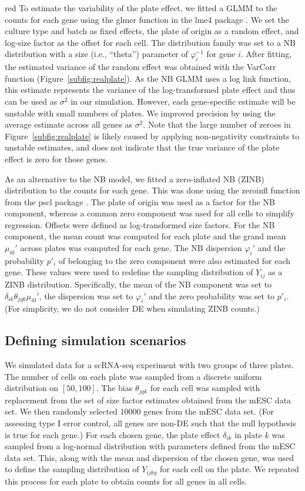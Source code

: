 \documentclass{article}
\begin{document}
\begin{color}{red}
To estimate the variability of the plate effect, we fitted a GLMM to the counts for each gene using the glmer function in the lme4 package \citep{bates2015fitting}.
We set the culture type and batch as fixed effects, the plate of origin as a random effect, and log-size factor as the offset for each cell.
The distribution family was set to a NB distribution with a size (i.e., ``theta'') parameter of $\varphi_i^{-1}$ for gene $i$.
After fitting, the estimated variance of the random effect was obtained with the VarCorr function (Figure~\ref{subfig:realplate}).
As the NB GLMM uses a log link function, this estimate represents the variance of the log-transformed plate effect and thus can be used as $\sigma^2$ in our simulation.
However, each gene-specific estimate will be unstable with small numbers of plates.
We improved precision by using the average estimate across all genes as $\sigma^2$.
Note that the large number of zeroes in Figure~\ref{subfig:realplate} is likely caused by applying non-negativity constraints to unstable estimates, and does not indicate that the true variance of the plate effect is zero for those genes. 

As an alternative to the NB model, we fitted a zero-inflated NB (ZINB) distribution to the counts for each gene.
This was done using the zeroinfl function from the pscl package \citep{zeilis2008regression}.
The plate of origin was used as a factor for the NB component, whereas a common zero component was used for all cells to simplify regression.
Offsets were defined as log-transformed size factors.
For the NB component, the mean count was computed for each plate and the grand mean $\mu_{i0}'$ across plates was computed for each gene.
The NB dispersion $\varphi_i'$ and the probability $p'_i$ of belonging to the zero component were also estimated for each gene.
These values were used to redefine the sampling distribution of $Y_{ij}$ as a ZINB distribution.
Specifically, the mean of the NB component was set to $\delta_{ik}\theta_{jgk}\mu_{i0}'$, the dispersion was set to $\varphi_i'$ and the zero probability was set to $p'_i$.
(For simplicity, we do not consider DE when simulating ZINB counts.)

\subsection{Defining simulation scenarios}
We simulated data for a scRNA-seq experiment with two groups of three plates.
The number of cells on each plate was sampled from a discrete uniform distribution on $[50, 100]$.
The bias $\theta_{jgk}$ for each cell was sampled with replacement from the set of size factor estimates obtained from the mESC data set.
We then randomly selected 10000 genes from the mESC data set.
(For assessing type I error control, all genes are non-DE such that the null hypothesis is true for each gene.)
For each chosen gene, the plate effect $\delta_{ik}$ in plate $k$ was sampled from a log-normal distribution with parameters defined from the mESC data set.
This, along with the mean and dispersion of the chosen gene, was used to define the sampling distribution of $Y_{ijkg}$ for each cell on the plate.
We repeated this process for each plate to obtain counts for all genes in all cells.


\end{color}
\end{document}
